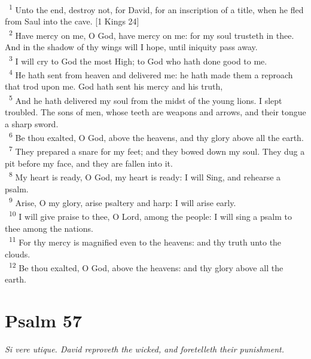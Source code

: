 \documentclass[a5paper,12pt]{article}
\begin{document}
\begin{multicols*}{2}
~\textsuperscript{1} Unto the end, destroy not, for David, for an inscription of a title, when he fled from Saul into the cave. [1 Kings 24]\\
~\textsuperscript{2} Have mercy on me, O God, have mercy on me: for my soul trusteth in thee. And in the shadow of thy wings will I hope, until iniquity pass away.\\
~\textsuperscript{3} I will cry to God the most High; to God who hath done good to me.\\
~\textsuperscript{4} He hath sent from heaven and delivered me: he hath made them a reproach that trod upon me. God hath sent his mercy and his truth,\\
~\textsuperscript{5} And he hath delivered my soul from the midst of the young lions. I slept troubled. The sons of men, whose teeth are weapons and arrows, and their tongue a sharp sword.\\
~\textsuperscript{6} Be thou exalted, O God, above the heavens, and thy glory above all the earth.\\
~\textsuperscript{7} They prepared a snare for my feet; and they bowed down my soul. They dug a pit before my face, and they are fallen into it.\\
~\textsuperscript{8} My heart is ready, O God, my heart is ready: I will Sing, and rehearse a psalm.\\
~\textsuperscript{9} Arise, O my glory, arise psaltery and harp: I will arise early.\\
~\textsuperscript{10} I will give praise to thee, O Lord, among the people: I will sing a psalm to thee among the nations.\\
~\textsuperscript{11} For thy mercy is magnified even to the heavens: and thy truth unto the clouds.\\
~\textsuperscript{12} Be thou exalted, O God, above the heavens: and thy glory above all the earth.\\

\section{Psalm 57}
\label{sec:org2ff0385}
\emph{Si vere utique. David reproveth the wicked, and foretelleth their punishment.}\\


\end{multicols*}
\end{document}

